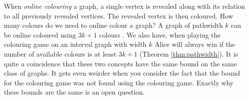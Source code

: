When \textit{online colouring} a graph, a single vertex is revealed along with its relation to all previously revealed vertices. The revealed vertex is then coloured. How many colours do we need to online colour a graph? A graph of pathwidth $k$ can be online coloured using $3k+1$ colours \cite{kierstead1981extremal}. 
We also have, when playing the colouring game on an interval graph with width $k$ Alice will always win if the number of available colours is at least $3k+1$ (Theorem \ref{thm:pathwidth}). It is quite a coincidence that these two concepts have the same bound on the same class of graphs. It gets even weirder when you consider the fact that the bound for the colouring game was not found using the colouring game. Exactly why these bounds are the same is an open question. 















    
